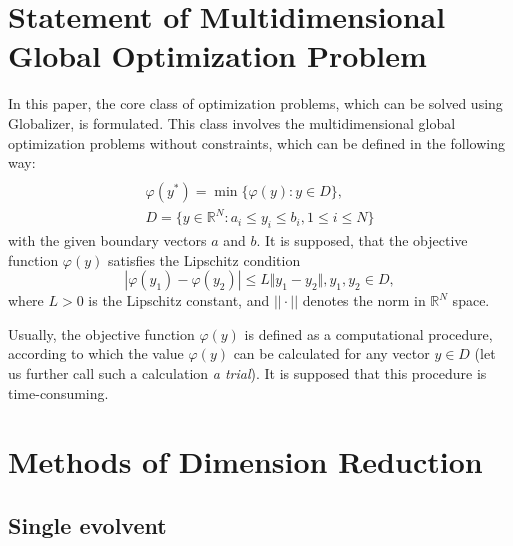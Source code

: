 \documentclass[runningheads]{llncs}
\begin{document}
\section{Statement of Multidimensional Global Optimization Problem}
In this paper, the core class of optimization problems, which can be solved using
Globalizer, is formulated. This class involves the multidimensional global
optimization problems without constraints, which can be defined in the following way:
\begin{equation}
\label{eq:task}
\begin{array}{cr}\\
  \varphi(y^*)=\min\{\varphi(y):y\in D\}, \\
  D=\{y\in \mathbb{R}^N:a_i\leq y_i\leq{b_i}, 1\leq{i}\leq{N}\}
\end{array}
\end{equation}
with the given boundary vectors  $a$ and  $b$. It is supposed, that the objective function
\(\varphi(y)\) satisfies the Lipschitz condition
\begin{equation}
\label{eq:lip}
|\varphi(y_1)-\varphi(y_2)|\leq L\Vert y_1-y_2\Vert,y_1,y_2\in D,
\end{equation}
where \(L>0\) is the Lipschitz constant, and \(||\cdot||\) denotes the norm in \(\mathbb{R}^N\)
space.
\par
Usually, the objective function \(\varphi(y)\) is defined as a computational procedure,
according to which the value \(\varphi(y)\) can be calculated for any vector \(y\in D\)
(let us further call such a calculation \textit{a trial}). It is supposed that this procedure
is time-consuming.

\section{Methods of Dimension Reduction}
\subsection{Single evolvent}
\end{document}
